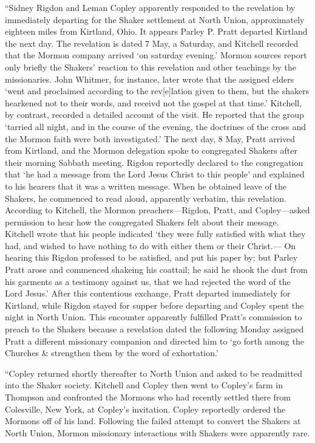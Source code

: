 			``Sidney Rigdon and Leman Copley apparently responded to the revelation by immediately departing for the Shaker settlement at North Union, approximately eighteen miles from Kirtland, Ohio. It appears Parley P. Pratt departed Kirtland the next day. The revelation is dated 7 May, a Saturday, and Kitchell recorded that the Mormon company arrived `on saturday evening.' Mormon sources report only briefly the Shakers' reaction to this revelation and other teachings by the missionaries. John Whitmer, for instance, later wrote that the assigned elders `went and proclaimed according to the rev[e]lation given to them, but the shakers hearkened not to their words, and receivd not the gospel at that time.' Kitchell, by contrast, recorded a detailed account of the visit. He reported that the group `tarried all night, and in the course of the evening, the doctrines of the cross and the Mormon faith were both investigated.' The next day, 8 May, Pratt arrived from Kirtland, and the Mormon delegation spoke to congregated Shakers after their morning Sabbath meeting. Rigdon reportedly declared to the congregation that `he had a message from the Lord Jesus Christ to this people' and explained to his hearers that it was a written message. When he obtained leave of the Shakers, he commenced to read aloud, apparently verbatim, this revelation. According to Kitchell, the Mormon preachers---Rigdon, Pratt, and Copley---asked permission to hear how the congregated Shakers felt about their message. Kitchell wrote that his people indicated `they were fully satisfied with what they had, and wished to have nothing to do with either them or their Christ.--- On hearing this Rigdon professed to be satisfied, and put his paper by; but Parley Pratt arose and commenced shakeing his coattail; he said he shook the dust from his garments as a testimony against us, that we had rejected the word of the Lord Jesus.' After this contentious exchange, Pratt departed immediately for Kirtland, while Rigdon stayed for supper before departing and Copley spent the night in North Union. This encounter apparently fulfilled Pratt's commission to preach to the Shakers because a revelation dated the following Monday assigned Pratt a different missionary companion and directed him to `go forth among the Churches \& strengthen them by the word of exhortation.'
			
			``Copley returned shortly thereafter to North Union and asked to be readmitted into the Shaker society. Kitchell and Copley then went to Copley's farm in Thompson and confronted the Mormons who had recently settled there from Colesville, New York, at Copley's invitation. Copley reportedly ordered the Mormons off of his land. Following the failed attempt to convert the Shakers at North Union, Mormon missionary interactions with Shakers were apparently rare.
			
